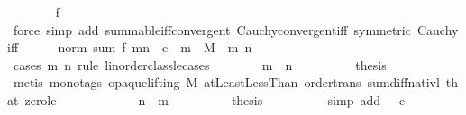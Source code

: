 \begin{isabellebody}
\ \ \ \ \ \ \isamarkupfalse%
\ f\ \isamarkupfalse%
\ {\isacharparenleft}{\kern0pt}force\ simp\ add{\isacharcolon}{\kern0pt}\ summable{\isacharunderscore}{\kern0pt}iff{\isacharunderscore}{\kern0pt}convergent\ Cauchy{\isacharunderscore}{\kern0pt}convergent{\isacharunderscore}{\kern0pt}iff\ {\isacharbrackleft}{\kern0pt}symmetric{\isacharbrackright}{\kern0pt}\ Cauchy{\isacharunderscore}{\kern0pt}iff{\isacharparenright}{\kern0pt}\isanewline
\ \ \ \ \isamarkupfalse%
\ {\isachardoublequoteopen}norm\ {\isacharparenleft}{\kern0pt}sum\ f\ {\isacharbraceleft}{\kern0pt}m{\isachardot}{\kern0pt}{\isachardot}{\kern0pt}{\isacharless}{\kern0pt}n{\isacharbraceright}{\kern0pt}{\isacharparenright}{\kern0pt}\ {\isacharless}{\kern0pt}\ e{\isachardoublequoteclose}\ \ {\isachardoublequoteopen}m\ {\isasymge}\ M{\isachardoublequoteclose}\ \ m\ n\isanewline
\ \ \ \ \isamarkupfalse%
\ {\isacharparenleft}{\kern0pt}cases\ m\ n\ rule{\isacharcolon}{\kern0pt}\ linorder{\isacharunderscore}{\kern0pt}class{\isachardot}{\kern0pt}le{\isacharunderscore}{\kern0pt}cases{\isacharparenright}{\kern0pt}\isanewline
\ \ \ \ \ \ \isamarkupfalse%
\ {\isachardoublequoteopen}m\ {\isasymle}\ n{\isachardoublequoteclose}\isanewline
\ \ \ \ \ \ \isamarkupfalse%
\ \isamarkupfalse%
\ {\isacharquery}{\kern0pt}thesis\isanewline
\ \ \ \ \ \ \ \ \isamarkupfalse%
\ {\isacharparenleft}{\kern0pt}metis\ {\isacharparenleft}{\kern0pt}mono{\isacharunderscore}{\kern0pt}tags{\isacharcomma}{\kern0pt}\ opaque{\isacharunderscore}{\kern0pt}lifting{\isacharparenright}{\kern0pt}\ M\ atLeast{}LessThan\ order{\isacharunderscore}{\kern0pt}trans\ sum{\isacharunderscore}{\kern0pt}diff{\isacharunderscore}{\kern0pt}nat{\isacharunderscore}{\kern0pt}ivl\ that\ zero{\isacharunderscore}{\kern0pt}le{\isacharparenright}{\kern0pt}\isanewline
\ \ \ \ \isamarkupfalse%
\isanewline
\ \ \ \ \ \ \isamarkupfalse%
\ {\isachardoublequoteopen}n\ {\isasymle}\ m{\isachardoublequoteclose}\isanewline
\ \ \ \ \ \ \isamarkupfalse%
\ \isamarkupfalse%
\ {\isacharquery}{\kern0pt}thesis\isanewline
\ \ \ \ \ \ \ \ \isamarkupfalse%
\ {\isacharparenleft}{\kern0pt}simp\ add{\isacharcolon}{\kern0pt}\ {\isacartoucheopen}{}\ {\isacharless}{\kern0pt}\ e{\isacartoucheclose}{\isacharparenright}{\kern0pt}\isanewline
\ \ \ \ \isamarkupfalse%
\isanewline
\ \ \ \ \isamarkupfalse%

\end{isabellebody}
